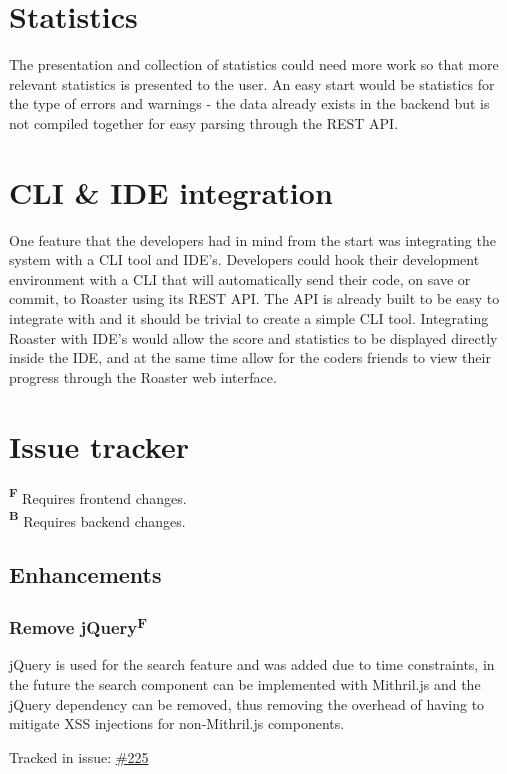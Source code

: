 \documentclass[12pt,a4paper]{report}
\begin{document}
\section{Statistics}
The presentation and collection of statistics could need more work so that more relevant statistics is presented to the user. An easy start would be statistics for the type of errors and warnings - the data already exists in the backend but is not compiled together for easy parsing through the REST API.

\section{CLI \& IDE integration}
One feature that the developers had in mind from the start was integrating the system with a CLI tool and IDE's. Developers could hook their development environment with a CLI that will automatically send their code, on save or commit, to Roaster using its REST API. The API is already built to be easy to integrate with and it should be trivial to create a simple CLI tool. Integrating Roaster with IDE's would allow the score and statistics to be displayed directly inside the IDE, and at the same time allow for the coders friends to view their progress through the Roaster web interface.

\section{Issue tracker}
\label{sec:issue-tracker}
\textbf{\textsuperscript{F}} Requires frontend changes. \\
\textbf{\textsuperscript{B}} Requires backend changes.

\subsection*{Enhancements}
\subsubsection{Remove jQuery\texorpdfstring{\textsuperscript{F}}{}}
\label{subsec:remove-jquery}
jQuery is used for the search feature and was added due to time constraints, in the future the search component can be implemented with Mithril.js and the jQuery dependency can be removed, thus removing the overhead of having to mitigate XSS injections for non-Mithril.js components.

Tracked in issue: \href{https://github.com/LuleaUniversityOfTechnology/2018-project-roaster/issues/225}{\#225}
\end{document}
